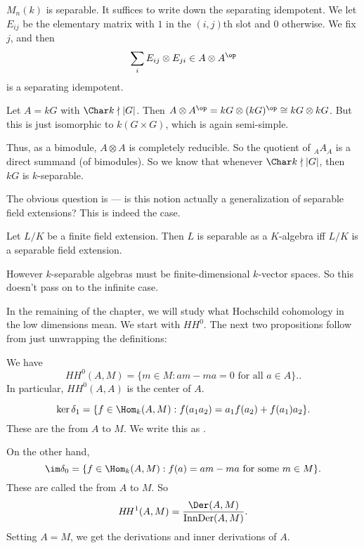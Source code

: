 \documentclass[a4paper]{article}
\newcommand\HH{H\!H}
\begin{document}
\begin{eg}
  $M_n(k)$ is separable. It suffices to write down the separating idempotent. We let $E_{ij}$ be the elementary matrix with $1$ in the $(i,j)$th slot and $0$ otherwise. We fix $j$, and then
  \[
    \sum_i E_{ij} \otimes E_{ji} \in A\otimes A^\op
  \]
  is a separating idempotent.
\end{eg}

\begin{eg}
  Let $A = kG$ with $\Char k \nmid |G|$. Then $A \otimes A^\op = kG \otimes (kG)^\op \cong kG \otimes kG$. But this is just isomorphic to $k(G \times G)$, which is again semi-simple.

  Thus, as a bimodule, $A \otimes A$ is completely reducible. So the quotient of $_AA_A$ is a direct summand (of bimodules). So we know that whenever $\Char k \nmid |G|$, then $kG$ is $k$-separable.
\end{eg}

The obvious question is --- is this notion actually a generalization of separable field extensions? This is indeed the case.
\begin{fact} %
  Let $L/K$ be a finite field extension. Then $L$ is separable as a $K$-algebra iff $L/K$ is a separable field extension.
\end{fact}
However $k$-separable algebras must be finite-dimensional $k$-vector spaces. So this doesn't pass on to the infinite case.

In the remaining of the chapter, we will study what Hochschild cohomology in the low dimensions mean. We start with $\HH^0$. The next two propositions follow from just unwrapping the definitions:
\begin{prop}
  We have
  \[
    \HH^0(A, M) = \{m \in M : am - ma = 0\text{ for all }a \in A\}..
  \]
  In particular, $\HH^0(A, A)$ is the center of $A$.
\end{prop}

\begin{prop}
  \[
    \ker \delta_1 = \{f \in \Hom_k(A, M): f(a_1 a_2) = a_1 f(a_2) + f(a_1) a_2\}.
  \]
  These are the  from $A$ to $M$. We write this as .

  On the other hand,
  \[
    \im \delta_0 = \{f \in \Hom_k(A, M): f(a) = am - ma \text{ for some }m \in M\}.
  \]
  These are called the  from $A$ to $M$. So
  \[
    \HH^1(A, M) = \frac{\Der(A, M)}{\mathrm{InnDer}(A, M)}.
  \]
  Setting $A = M$, we get the derivations and inner derivations of $A$.
\end{prop}
\end{document}
